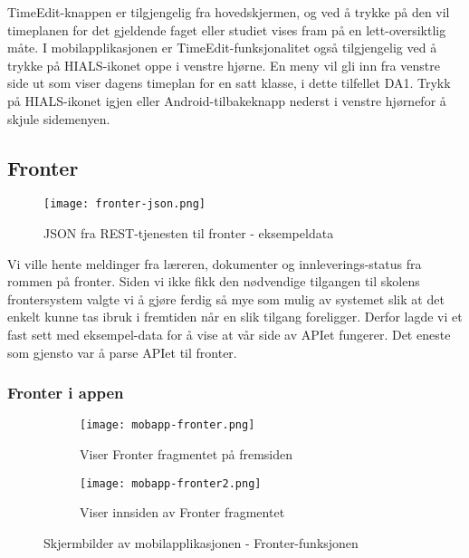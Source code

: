 \documentclass[../main.tex]{subfiles}
\begin{document}
TimeEdit-knappen er tilgjengelig fra hovedskjermen, og ved å trykke på den vil timeplanen for det gjeldende faget eller studiet vises fram på en lett-oversiktlig måte.
I mobilapplikasjonen er TimeEdit-funksjonalitet også tilgjengelig ved å trykke på HIALS-ikonet oppe i venstre hjørne. En meny vil gli inn fra venstre side ut som viser dagens timeplan for en satt klasse, i dette tilfellet DA1. Trykk på HIALS-ikonet igjen eller Android-tilbakeknapp nederst i venstre hjørnefor å skjule sidemenyen.








\subsection{Fronter}

\begin{figure}[H]
  \centering
  \texttt{[image: fronter-json.png]}
  \caption{JSON fra REST-tjenesten til fronter - eksempeldata}
\end{figure}

Vi ville hente meldinger fra læreren, dokumenter og innleverings-status fra rommen på fronter.\newline
\newline
Siden vi ikke fikk den nødvendige tilgangen til skolens frontersystem valgte vi å gjøre ferdig så mye som mulig av systemet slik at det enkelt kunne tas ibruk i fremtiden når en slik tilgang foreligger. Derfor lagde vi et fast sett med eksempel-data for å vise at vår side av APIet fungerer. Det eneste som gjensto var å parse APIet til fronter.

\subsubsection{Fronter i appen}

\begin{figure}[H]
        \centering
        \begin{subfigure}[b]{0.3\textwidth}
                \centering
                \texttt{[image: mobapp-fronter.png]}
                \caption{Viser Fronter fragmentet på fremsiden}
        \end{subfigure}
        \quad
        \begin{subfigure}[b]{0.3\textwidth}
                \centering
                \texttt{[image: mobapp-fronter2.png]}
                \caption{Viser innsiden av Fronter fragmentet}
        \end{subfigure}
        \caption{Skjermbilder av mobilapplikasjonen - Fronter-funksjonen}
\end{figure}
\end{document}
